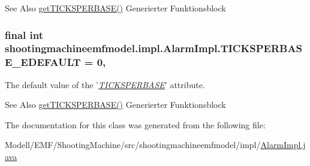 \begin{DoxySeeAlso}{See Also}
\hyperlink{classshootingmachineemfmodel_1_1impl_1_1_alarm_impl_aefdf43cc7e5b3ceae03f889f613e7522}{get\-T\-I\-C\-K\-S\-P\-E\-R\-B\-A\-S\-E()} Generierter Funktionsblock  
\end{DoxySeeAlso}
\hypertarget{classshootingmachineemfmodel_1_1impl_1_1_alarm_impl_a3c3b372b88aaa3f67b535965a8c3262a}{
\subsubsection[{T\-I\-C\-K\-S\-P\-E\-R\-B\-A\-S\-E\-\_\-\-E\-D\-E\-F\-A\-U\-L\-T}]{\setlength{\rightskip}{0pt plus 5cm}final int shootingmachineemfmodel.\-impl.\-Alarm\-Impl.\-T\-I\-C\-K\-S\-P\-E\-R\-B\-A\-S\-E\-\_\-\-E\-D\-E\-F\-A\-U\-L\-T = 0\hspace{0.3cm}{\ttfamily [static]}, {\ttfamily [protected]}}}\label{classshootingmachineemfmodel_1_1impl_1_1_alarm_impl_a3c3b372b88aaa3f67b535965a8c3262a}
The default value of the '\hyperlink{classshootingmachineemfmodel_1_1impl_1_1_alarm_impl_aefdf43cc7e5b3ceae03f889f613e7522}{{\itshape T\-I\-C\-K\-S\-P\-E\-R\-B\-A\-S\-E}}' attribute.

\begin{DoxySeeAlso}{See Also}
\hyperlink{classshootingmachineemfmodel_1_1impl_1_1_alarm_impl_aefdf43cc7e5b3ceae03f889f613e7522}{get\-T\-I\-C\-K\-S\-P\-E\-R\-B\-A\-S\-E()} Generierter Funktionsblock  
\end{DoxySeeAlso}


The documentation for this class was generated from the following file\-:\begin{DoxyCompactItemize}
\item 
Modell/\-E\-M\-F/\-Shooting\-Machine/src/shootingmachineemfmodel/impl/\hyperlink{_alarm_impl_8java}{Alarm\-Impl.\-java}\end{DoxyCompactItemize}
